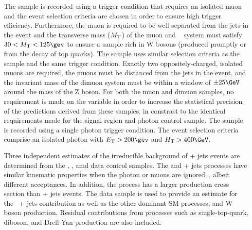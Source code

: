 The \mj sample is recorded using a trigger condition that requires an
isolated muon and the event selection criteria are chosen in order to
ensure high trigger efficiency. Furthermore, the muon is required to
be well separated from the jets in the event and the transverse mass
($M_{\rm T}$) of the muon and \ETmiss~\cite{CMS-PAS-PFT-09-001,
  CMS-PAS-PFT-10-001} system must satisfy $30 < M_{\rm T} < 125\gev$
to ensure a sample rich in W bosons (produced promptly or from the
decay of top quarks). The \mmj sample uses similar selection criteria
as the \mj sample and the same trigger condition. Exactly two
oppositely-charged, isolated muons are required, the muons must be
distanced from the jets in the event, and the invariant mass of the
dimuon system must be within a window of $\pm 25\GeV$ around the mass
of the Z boson. For both the muon and dimuon samples, no requirement
is made on the variable \alphat in order to increase the statistical
precision of the predictions derived from these samples, in constrast
to the identical \alphat requirements made for the signal region and
photon control sample. The \gj sample is recorded using a single
photon trigger condition. The event selection criteria comprise an
isolated photon with $\Et > 200\gev$ and $\scalht > 400\GeV$.

Three independent estimates of the irreducible background of \znunu +
jets events are determined from the \gj, \mmj, amd \mj data control
samples. The \gj and \zmumu + jets processes have similar kinematic
properties when the photon or muons are ignored~\cite{Bern:2011pa}, 
albeit different acceptances. In addition, the \gj process has a
larger production cross section than \znunu + jets events. The \mj
data sample is used to provide an estimate for the \znunu\ + jets
contribution as well as the other dominant SM processes, \ttbar and W
boson production. Residual contributions from processes such as
single-top-quark, diboson, and Drell-Yan production are also included.


